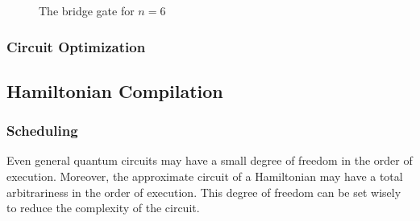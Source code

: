 \documentclass{report}
\begin{document}
\def\qceq{\midstick[6,brackets=none]{=}}
\begin{figure}[h]
  \centering
{}
  \caption{The bridge gate for $n=6$}
\end{figure}

\subsubsection{Circuit Optimization}

\subsection{Hamiltonian Compilation}


\subsubsection{Scheduling}

Even general quantum circuits may have a small degree of freedom in the order of execution. Moreover, the approximate circuit of a Hamiltonian may have a total arbitrariness in the order of execution. This degree of freedom can be set wisely to reduce the complexity of the circuit.
\end{document}
